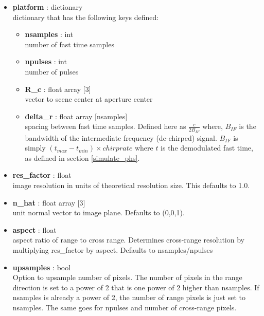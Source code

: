 \documentclass{article}
\newcommand{\defs}[2]{\textbf{{#1}} : {#2}}
\begin{document}
\begin{itemize}
  	\item \defs{platform}{dictionary}\\
  	dictionary that has the following keys defined:
	\begin{itemize}
    	\item \defs{nsamples}{int}\\
    		number of fast time samples
	    \item \defs{npulses}{int}\\
	    	number of pulses
	    \item \defs{R\_c}{float array [3]}\\
	       	vector to scene center at aperture center
	    \item\defs{delta\_r}{float array [nsamples]}\\
	    	spacing between fast time samples.  Defined here as $\frac{c}{2B_{IF}}$ where, $B_{IF}$ is the bandwidth of the intermediate frequency (de-chirped) signal.  $B_{IF}$ is simply $(t_{max}-t_{min})\times chirprate$ where $t$ is the demodulated fast time, as defined in section \ref{simulate_phs}.
	\end{itemize}
	\item\defs{res\_factor}{float}\\
	image resolution in units of theoretical resolution size.  This defaults to 1.0.
	\item\defs{n\_hat}{float array [3]}\\
	unit normal vector to image plane.  Defaults to (0,0,1).
	\item\defs{aspect}{float}\\
	aspect ratio of range to cross range.  Determines cross-range resolution by multiplying res\_factor by aspect.  Defaults to nsamples/npulses
	\item\defs{upsamples}{bool}\\
	Option to upsample number of pixels.  The number of pixels in the range direction is set to a power of 2 that is one power of 2 higher than nsamples.  If nsamples is already a power of 2, the number of range pixels is just set to nsamples.  The same goes for npulses and number of cross-range pixels. 
	
\end{itemize}
\end{document}
